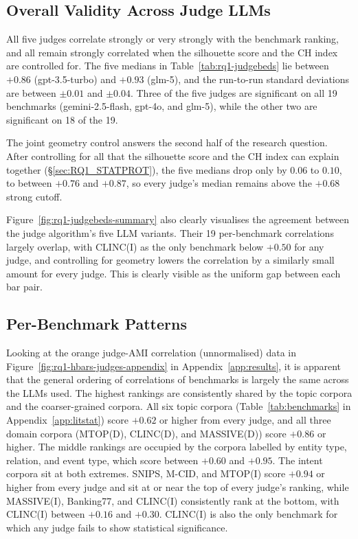 \documentclass[11pt,a4paper,oneside]{report}
\begin{document}
\subsection{Overall Validity Across Judge LLMs}

All five judges correlate strongly or very strongly with the benchmark ranking, and all remain strongly correlated when the silhouette score and the CH index are controlled for. The five medians in Table~\ref{tab:rq1-judgebeds} lie between $+0.86$ ({\small\ttfamily gpt-3.5-turbo}) and $+0.93$ ({\small\ttfamily glm-5}), and the run-to-run standard deviations are between $\pm 0.01$ and $\pm 0.04$. Three of the five judges are significant on all 19 benchmarks ({\small\ttfamily gemini-2.5-flash}, {\small\ttfamily gpt-4o}, and {\small\ttfamily glm-5}), while the other two are significant on 18 of the 19.

The joint geometry control answers the second half of the research question. After controlling for all that the silhouette score and the CH index can explain together (\S\ref{sec:RQ1_STATPROT}), the five medians drop only by $0.06$ to $0.10$, to between $+0.76$ and $+0.87$, so every judge's median remains above the $+0.68$ strong cutoff.

Figure~\ref{fig:rq1-judgebeds-summary} also clearly visualises the agreement between the judge algorithm's five LLM variants. Their 19 per-benchmark correlations largely overlap, with CLINC(I) as the only benchmark below $+0.50$ for any judge, and controlling for geometry lowers the correlation by a similarly small amount for every judge. This is clearly visible as the uniform gap between each bar pair.

\subsection{Per-Benchmark Patterns}

Looking at the orange judge-AMI correlation (unnormalised) data in Figure~\ref{fig:rq1-hbars-judges-appendix} in Appendix~\ref{app:results}, it is apparent that the general ordering of correlations of benchmarks is largely the same across the LLMs used. The highest rankings are consistently shared by the topic corpora and the coarser-grained corpora. All six topic corpora (Table~\ref{tab:benchmarks} in Appendix~\ref{app:litstat}) score $+0.62$ or higher from every judge, and all three domain corpora (MTOP(D), CLINC(D), and MASSIVE(D)) score $+0.86$ or higher. The middle rankings are occupied by the corpora labelled by entity type, relation, and event type, which score between $+0.60$ and $+0.95$. The intent corpora sit at both extremes. SNIPS, M-CID, and MTOP(I) score $+0.94$ or higher from every judge and sit at or near the top of every judge's ranking, while MASSIVE(I), Banking77, and CLINC(I) consistently rank at the bottom, with CLINC(I) between $+0.16$ and $+0.30$. CLINC(I) is also the only benchmark for which any judge fails to show statistical significance.
\end{document}
